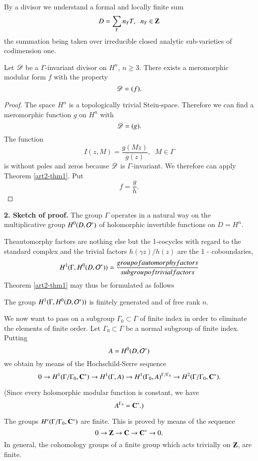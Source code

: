 By a divisor we understand a formal and locally finite sum
$$
D = \sum\limits_Y n_Y T, \;\; n_Y \in \mathbf{Z} 
$$
the summation being taken over irreducible closed analytic sub-varieties of codimension one.

\begin{theorem}\label{art2-thm2}%
Let $\mathscr{D}$ be a $\Gamma$-invariant divisor on $H^n$, $n \geqslant 3$. There exists a meromorphic modular form $f$ with the property
$$
\mathscr{D} = (f).
$$
\end{theorem}

\begin{proof}
The space $H^n$ is a topologically trivial Stein-space. Therefore we can find a meromorphic function $g$ on $H^n$ with
$$
\mathscr{D}  = (g).
$$
The function
$$
I (z, M) = \frac{g(Mz)}{g(z)}, \;\; M \in \Gamma
$$
is without poles and zeros because $\mathscr{D}$ is $\Gamma$-invariant. We therefore can apply Theorem \ref{art2-thm1}. Put
$$
f = \frac{g}{h}.
$$
\end{proof}

\medskip
\noindent
\textbf{2. Sketch of proof.} The group $\Gamma$ operates in a natural way on the multiplicative group $H^0 (D, \mathcal{O}^\ast)$ of holomorphic invertible functions on $D = H^n$.

The\pageoriginale automorphy factors are nothing else but the 1-cocycles with regard to the standard complex and the trivial factors $h(\gamma z)/ h(z)$ are the 1 - coboundaries, \iec
$$
H^1 (\Gamma, H^0 (D, \mathcal{O}^\ast)) = \frac{group of automorphy factors}{subgroup of trivial factors}
$$
Theorem \ref{art2-thm1} may thus be formulated as follows

\begin{theorem}\label{art2-thm3}
The group $H^1 (\Gamma, H^0 (D, \mathcal{O}^\ast))$ is finitely generated and of free rank $n$.
\end{theorem}

We now want to pass on a subgroup $\Gamma_0 \subset \Gamma$ of finite index in order to eliminate the elements of finite order. Let $\Gamma_0 \subset \Gamma$ be a normal subgroup of finite index. Putting
$$
A = H^0 (D, \mathcal{O}^\ast)
$$
we obtain by means of the Hochschild-Serre sequence
$$
0 \to H^1 (\Gamma /\Gamma_0, \mathbf{C}^\ast) \to H^1 (\Gamma, A) \to H^1 (\Gamma_0, A)^{\Gamma/\Gamma_0} \to H^2 (\Gamma/\Gamma_0, \mathbf{C}^{\ast}).
$$

(Since every holomorphic modular function is constant, we have
$$
A^{\Gamma_0} = \mathbf{C}^\ast.)
$$

The groups $H^v (\Gamma /\Gamma_0, \mathbf{C}^\ast)$ are finite. This is proved by means of the sequence
$$
0 \to \mathbf{Z} \to \mathbf{C} \to \mathbf{C}^\ast \to 0.
$$
In general, the cohomology groups of a finite group which acts trivially on $\mathbf{Z}$, are finite.

